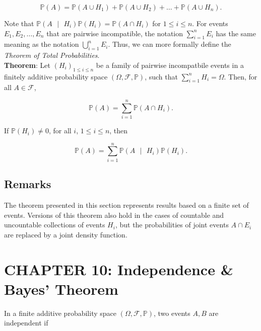\documentclass[12pt]{article}
\newcommand{\prob}[1]{\mathbb{P}(#1)}
\newcommand{\condprob}[2]{\mathbb{P}(#1 \text{ } \lvert \text{ } #2)}
\newcommand{\field}{\mathcal{F}}
\begin{document}
\begin{equation*}
\prob{A} = \prob{A \cup H_1} + \prob{A \cup H_2} + \ldots + \prob{A \cup H_n} .
\end{equation*}

\noindent
Note that $\condprob{A}{H_i} \prob{H_i} = \prob{A \cap H_i}$ for $1 \leq i \leq n$. For events $E_1, E_2, \ldots, E_n$ that are pairwise incompatible, the notation $\sum_{i=1}^{n} E_i$ has the same meaning as the notation $\bigcup_{i=1}^{n} E_i$. Thus, we can more formally define the \textit{Theorem of Total Probabilities}. \\

\noindent
\textbf{Theorem}: Let $(H_i)_{1 \leq i \leq n}$ be a family of pairwise incompatbile events in a finitely additive probability space $(\Omega, \field, \mathbb{P})$, such that $\sum_{i=1}^{n} H_i = \Omega$. Then, for all $A \in \field$,

\begin{equation*}
\prob{A} = \sum_{i=1}^{n} \prob{A \cap H_i}.
\end{equation*}

\noindent
If $\prob{H_i} \neq 0$, for all $i$, $1 \leq i \leq n$, then

\begin{equation*}
\prob{A} = \sum_{i=1}^{n} \condprob{A}{H_i} \prob{H_i}.
\end{equation*}

\subsection*{Remarks}
\noindent
The theorem presented in this section represents results based on a finite set of events. Versions of this theorem also hold in the cases of countable and uncountable collections of events $H_i$, but the probabilities of joint events $A \cap E_i$ are replaced by a joint density function.

\section*{CHAPTER 10: Independence \& Bayes' Theorem}
\noindent
In a finite additive probability space $(\Omega, \field, \mathbb{P})$, two events $A,B$ are independent if
\end{document}
